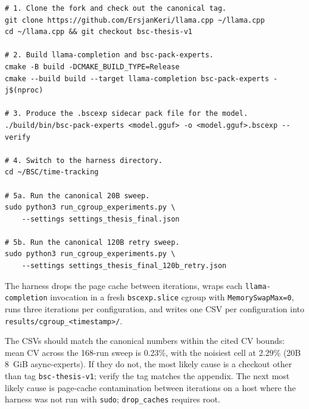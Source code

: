 \begin{lstlisting}[basicstyle=\ttfamily\small,breaklines=true]
# 1. Clone the fork and check out the canonical tag.
git clone https://github.com/ErsjanKeri/llama.cpp ~/llama.cpp
cd ~/llama.cpp && git checkout bsc-thesis-v1

# 2. Build llama-completion and bsc-pack-experts.
cmake -B build -DCMAKE_BUILD_TYPE=Release
cmake --build build --target llama-completion bsc-pack-experts -j$(nproc)

# 3. Produce the .bscexp sidecar pack file for the model.
./build/bin/bsc-pack-experts <model.gguf> -o <model.gguf>.bscexp --verify

# 4. Switch to the harness directory.
cd ~/BSC/time-tracking

# 5a. Run the canonical 20B sweep.
sudo python3 run_cgroup_experiments.py \
    --settings settings_thesis_final.json

# 5b. Run the canonical 120B retry sweep.
sudo python3 run_cgroup_experiments.py \
    --settings settings_thesis_final_120b_retry.json
\end{lstlisting}

The harness drops the page cache between iterations, wraps each \texttt{llama-completion} invocation in a fresh \texttt{bscexp.slice} cgroup with \texttt{MemorySwapMax=0}, runs three iterations per configuration, and writes one CSV per configuration into \texttt{results/cgroup\_<timestamp>/}.

The CSVs should match the canonical numbers within the cited CV bounds: mean CV across the 168-run sweep is 0.23\%, with the noisiest cell at 2.29\% (20B 8~GiB async-experts). If they do not, the most likely cause is a checkout other than tag \texttt{bsc-thesis-v1}; verify the tag matches the appendix. The next most likely cause is page-cache contamination between iterations on a host where the harness was not run with \texttt{sudo}; \texttt{drop\_caches} requires root.
